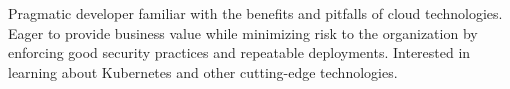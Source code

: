 

\begin{cvparagraph}

Pragmatic developer familiar with the benefits and pitfalls of cloud technologies. Eager to provide business value while minimizing risk to the organization by enforcing good security practices and repeatable deployments. Interested in learning about Kubernetes and other cutting-edge technologies.
\end{cvparagraph}
